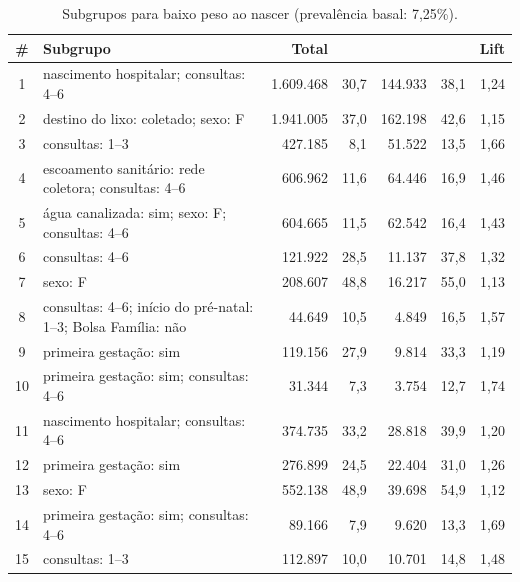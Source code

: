 \begin{table}[H]
\centering
\caption{Subgrupos para baixo peso ao nascer (prevalência basal: 7,25\%).}
\label{tab:bpn}

\scriptsize %
\setlength{\tabcolsep}{4pt} %
\renewcommand{\arraystretch}{1.08} %

\begin{tabularx}{\textwidth}{@{}c Y r r r r r@{}}
\toprule
\textbf{\#} & \textbf{Subgrupo} & \textbf{Total} & \textbf{} & \textbf{} & \textbf{} & \textbf{Lift} \\
\midrule
{}
1 & nascimento hospitalar; consultas: 4--6 & 1.609.468 & 30,7 & 144.933 & 38,1 & 1,24 \\
2 & destino do lixo: coletado; sexo: F & 1.941.005 & 37,0 & 162.198 & 42,6 & 1,15 \\
3 & consultas: 1--3 & 427.185 & 8,1 & 51.522 & 13,5 & 1,66 \\
4 & escoamento sanitário: rede coletora; consultas: 4--6 & 606.962 & 11,6 & 64.446 & 16,9 & 1,46 \\
5 & água canalizada: sim; sexo: F; consultas: 4--6 & 604.665 & 11,5 & 62.542 & 16,4 & 1,43 \\

6 & consultas: 4--6 & 121.922 & 28,5 & 11.137 & 37,8 & 1,32 \\
7 & sexo: F & 208.607 & 48,8 & 16.217 & 55,0 & 1,13 \\
8 & consultas: 4--6; início do pré-natal: 1--3; Bolsa Família: não & 44.649 & 10,5 & 4.849 & 16,5 & 1,57 \\
9 & primeira gestação: sim & 119.156 & 27,9 & 9.814 & 33,3 & 1,19 \\
10 & primeira gestação: sim; consultas: 4--6 & 31.344 & 7,3 & 3.754 & 12,7 & 1,74 \\

11 & nascimento hospitalar; consultas: 4--6 & 374.735 & 33,2 & 28.818 & 39,9 & 1,20 \\
12 & primeira gestação: sim & 276.899 & 24,5 & 22.404 & 31,0 & 1,26 \\
13 & sexo: F & 552.138 & 48,9 & 39.698 & 54,9 & 1,12 \\
14 & primeira gestação: sim; consultas: 4--6 & 89.166 & 7,9 & 9.620 & 13,3 & 1,69 \\
15 & consultas: 1--3 & 112.897 & 10,0 & 10.701 & 14,8 & 1,48 \\


\end{tabularx}
\end{table}
